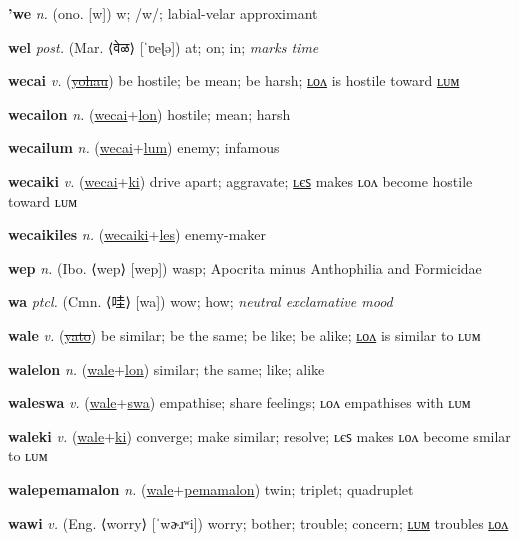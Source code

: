 \textbf{\hypertarget{'we}{'we}} \textit{n.} (ono. [w])
w; /w/; labial-velar approximant

\textbf{\hypertarget{wel}{wel}} \textit{post.} (Mar. ⟨{\devanagari{}वेळ}⟩ [ˈʋeɭə])
at; on; in; \textit{marks time}

\textbf{\hypertarget{wecai}{wecai}} \textit{v.} (\hyperlink{yohau}{\sout{yohau}})
be hostile; be mean; be harsh; \hyperlink{wecailon}{ʟᴏᴧ} is hostile toward \hyperlink{wecailum}{ʟᴜᴍ}

\textbf{\hypertarget{wecailon}{wecailon}} \textit{n.} (\hyperlink{wecai}{wecai}+\allowbreak \hyperlink{lon}{lon})
hostile; mean; harsh

\textbf{\hypertarget{wecailum}{wecailum}} \textit{n.} (\hyperlink{wecai}{wecai}+\allowbreak \hyperlink{lum}{lum})
enemy; infamous

\textbf{\hypertarget{wecaiki}{wecaiki}} \textit{v.} (\hyperlink{wecai}{wecai}+\allowbreak \hyperlink{ki}{ki})
drive apart; aggravate; \hyperlink{wecaikiles}{ʟєꜱ} makes ʟᴏᴧ become hostile toward ʟᴜᴍ

\textbf{\hypertarget{wecaikiles}{wecaikiles}} \textit{n.} (\hyperlink{wecaiki}{wecaiki}+\allowbreak \hyperlink{les}{les})
enemy-maker

\textbf{\hypertarget{wep}{wep}} \textit{n.} (Ibo. ⟨wep⟩ [wep])
wasp; Apocrita minus Anthophilia and Formicidae

\textbf{\hypertarget{wa}{wa}} \textit{ptcl.} (Cmn. ⟨{\chinese{}哇}⟩ [wa])
wow; how; \textit{neutral exclamative mood}

\textbf{\hypertarget{wale}{wale}} \textit{v.} (\hyperlink{yato}{\sout{yato}})
be similar; be the same; be like; be alike; \hyperlink{walelon}{ʟᴏᴧ} is similar to ʟᴜᴍ

\textbf{\hypertarget{walelon}{walelon}} \textit{n.} (\hyperlink{wale}{wale}+\allowbreak \hyperlink{lon}{lon})
similar; the same; like; alike

\textbf{\hypertarget{waleswa}{waleswa}} \textit{v.} (\hyperlink{wale}{wale}+\allowbreak \hyperlink{swa}{swa})
empathise; share feelings; ʟᴏᴧ empathises with ʟᴜᴍ

\textbf{\hypertarget{waleki}{waleki}} \textit{v.} (\hyperlink{wale}{wale}+\allowbreak \hyperlink{ki}{ki})
converge; make similar; resolve; ʟєꜱ makes ʟᴏᴧ become smilar to ʟᴜᴍ

\textbf{\hypertarget{walepemamalon}{walepemamalon}} \textit{n.} (\hyperlink{wale}{wale}+\allowbreak \hyperlink{pemamalon}{pemamalon})
twin; triplet; quadruplet

\textbf{\hypertarget{wawi}{wawi}} \textit{v.} (Eng. ⟨worry⟩ [ˈwɚɹʷi])
worry; bother; trouble; concern; \hyperlink{wawilum}{ʟᴜᴍ} troubles \hyperlink{wawilon}{ʟᴏᴧ}

